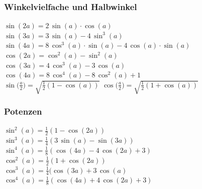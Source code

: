 			
		\subsubsection{Winkelvielfache und Halbwinkel}
		$\sin(2a) = 2 \, \sin(a) \cdot \cos(a)$ \\
		$\sin(3a) = 3 \, \sin(a) -4 \, \sin^3(a)$ \\ 
		$\sin(4a) = 8 \, \cos^3(a) \cdot \sin(a) - 4 \, \cos(a) \cdot \sin(a)$ \\
		\vspace{0.2cm}
		$\cos(2a) = \cos^2(a) - \sin^2(a)$ \\
		$\cos(3a) = 4 \, \cos^3(a) -3 \, \cos(a)$ \\ 
		$\cos(4a) = 8 \, \cos^4(a) - 8 \, \cos^2(a) + 1$ \\
		\vspace{0.2cm}
		$\sin \big( \frac{a}{2} \big) = \sqrt{\frac{1}{2}(1-\cos(a))} $ \qquad $\cos \big( \frac{a}{2} \big) = \sqrt{\frac{1}{2}(1+\cos(a))} $ 
		
		
		\subsubsection{Potenzen}
		$\sin^2(a) = \frac{1}{2}(1-\cos(2a))$ \\	
		$\sin^3(a) = \frac{1}{4}(3\, \sin(a) - \sin(3a))$ \\	
		$\sin^4(a) = \frac{1}{8}(\cos(4a) -4 \, \cos(2a) +3)$ \\	
		\vspace{0.2cm}
		$\cos^2(a) = \frac{1}{2}(1+\cos(2a))$ \\	
		$\cos^3(a) = \frac{1}{4}(\cos(3a) + 3 \, \cos(a)$ \\	
		$\cos^4(a) = \frac{1}{8}(\cos(4a) +4 \, \cos(2a) +3)$ 